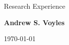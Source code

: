 \documentclass{resume2} %
\newif\iffull
\newif\ifday
\begin{document}

\fulltrue



\begin{center}
{\Large Research Experience}

{\large \textbf{Andrew S. Voyles}}

\today
\end{center} 



\end{document}
